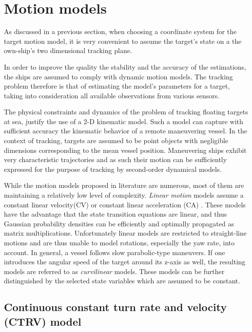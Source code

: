 \section{Motion models} \label{sec:MotionModels}

As discussed in a previous section, when choosing a coordinate system for the target motion model, it is very convenient to assume the target's state on a the own-ship's two dimensional tracking plane.



In order to improve the quality the stability and the accuracy of the estimations, the ships are assumed to comply with dynamic motion models. The tracking problem therefore is that of estimating the model's parameters for a target, taking into consideration all available observations from various sensors.


The physical constraints and dynamics of the problem of tracking floating targets at sea, justify the use of a 2-D kinematic model. Such a model can capture with sufficient accuracy the kinematic behavior of a remote maneuvering vessel. In the context of tracking, targets are assumed to be point objects with negligible dimensions corresponding to the mean vessel position. Maneuvering ships exhibit very characteristic trajectories and as such their  motion can be sufficiently expressed for the purpose of tracking by second-order dynamical models.

While the motion models proposed in literature are numerous, most of them are maintaining a relatively low level of complexity. \emph{Linear motion} models assume a constant linear velocity(CV) or constant linear acceleration (CA) \cite{Schubert2008}. These models have the advantage that the state transition equations are linear, and thus Gaussian probability densities can be efficiently and optimally propagated as matrix multiplications. Unfortunately linear models are restricted to straight-line motions and are thus unable to model rotations, especially the yaw rate, into account. In general, a vessel follows slow parabolic-type maneuvers. If one introduces the angular speed of the target around its z-axis as well, the resulting models are referred to as \emph{curvilinear} models. These models can be further distinguished by the selected state variables which are assumed to be constant.

\subsection{Continuous constant turn rate and velocity (CTRV) model}


